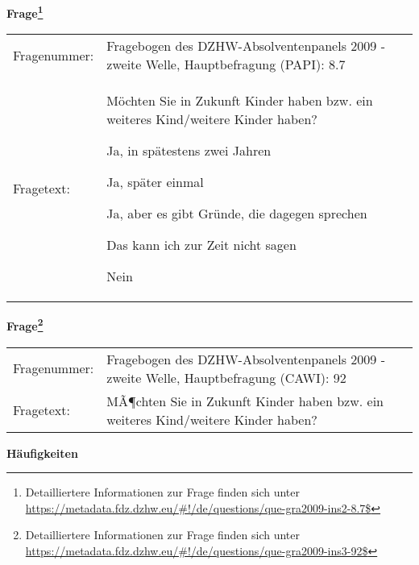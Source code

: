 				\vspace*{0.5cm}
                \noindent\textbf{Frage\footnote{Detailliertere Informationen zur Frage finden sich unter
		              \url{https://metadata.fdz.dzhw.eu/\#!/de/questions/que-gra2009-ins2-8.7$}}}\\
				\begin{tabularx}{\hsize}{@{}lX}
					Fragenummer: &
					  Fragebogen des DZHW-Absolventenpanels 2009 - zweite Welle, Hauptbefragung (PAPI):
					  8.7
 \\
					Fragetext: & Möchten Sie in Zukunft Kinder haben bzw. ein weiteres Kind/weitere Kinder haben?\par  Ja, in spätestens zwei Jahren\par  Ja, später einmal\par  Ja, aber es gibt Gründe, die dagegen sprechen\par  Das kann ich zur Zeit nicht sagen\par  Nein \\
				\end{tabularx}
				\vspace*{0.5cm}
                \noindent\textbf{Frage\footnote{Detailliertere Informationen zur Frage finden sich unter
		              \url{https://metadata.fdz.dzhw.eu/\#!/de/questions/que-gra2009-ins3-92$}}}\\
				\begin{tabularx}{\hsize}{@{}lX}
					Fragenummer: &
					  Fragebogen des DZHW-Absolventenpanels 2009 - zweite Welle, Hauptbefragung (CAWI):
					  92
 \\
					Fragetext: & MÃ¶chten Sie in Zukunft Kinder haben bzw. ein weiteres Kind/weitere Kinder haben? \\
				\end{tabularx}





        		\vspace*{0.5cm}
                \noindent\textbf{Häufigkeiten}

